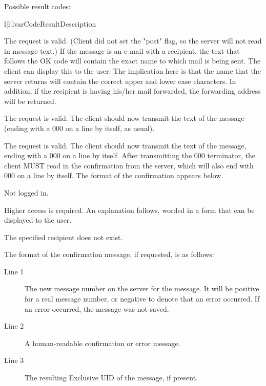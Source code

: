  Possible result codes:

\begin{tableiii}{l|l|l}{var}{Code}{Result}{Description}

    {The request is valid. (Client did not set the "post" flag, so the server
    will not read in message text.)   If the message is an e-mail with a
    recipient, the text that follows the OK code will contain the exact name to
    which mail is being sent.  The client can display this to the user.  The
    implication here is that the name that the server returns will contain the
    correct upper and lower case characters.  In addition, if the recipient is
    having his/her mail forwarded, the forwarding address will be returned.}

    {The request is valid.  The client should now transmit the text of the
    message (ending with a 000 on a line by itself, as usual).}

    {The request is valid.  The client should now transmit the text of the
    message, ending with a 000 on a line by itself.  After transmitting the 000
    terminator, the client MUST read in the confirmation from the server, which
    will also end with 000 on a line by itself.  The format of the confirmation
    appears below.}

    {Not logged in.}

    {Higher access is required.  An explanation follows, worded in a form that
    can be displayed to the user.}

    {The specified recipient does not exist.}


\end{tableiii}

The format of the confirmation message, if requested, is as follows:

\begin{description}

\item[Line 1]
    {The new message number on the server for the message.  It will be positive
    for a real message number, or negative to denote that an error occurred.  If
    an error occurred, the message was not saved.}

\item[Line 2]
    {A human-readable confirmation or error message.}

\item[Line 3]
    {The resulting Exclusive UID of the message, if present.}

\end{description}


